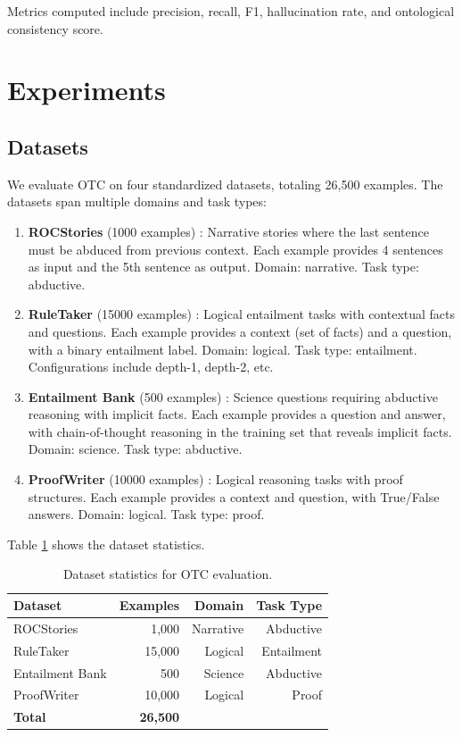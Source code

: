 \documentclass[11pt,letterpaper]{article}
\begin{document}
Metrics computed include precision, recall, F1, hallucination rate, and ontological consistency score.

\section{Experiments}

\subsection{Datasets}

We evaluate OTC on four standardized datasets, totaling 26,500 examples. The datasets span multiple domains and task types:

\begin{enumerate}
    \item \textbf{ROCStories} (1000 examples) \cite{Mostafazadeh2016}: Narrative stories where the last sentence must be abduced from previous context. Each example provides 4 sentences as input and the 5th sentence as output. Domain: narrative. Task type: abductive.
    
    \item \textbf{RuleTaker} (15000 examples) \cite{Clark2020}: Logical entailment tasks with contextual facts and questions. Each example provides a context (set of facts) and a question, with a binary entailment label. Domain: logical. Task type: entailment. Configurations include depth-1, depth-2, etc.
    
    \item \textbf{Entailment Bank} (500 examples) \cite{Dalvi2021}: Science questions requiring abductive reasoning with implicit facts. Each example provides a question and answer, with chain-of-thought reasoning in the training set that reveals implicit facts. Domain: science. Task type: abductive.
    
    \item \textbf{ProofWriter} (10000 examples) \cite{Tafjord2021}: Logical reasoning tasks with proof structures. Each example provides a context and question, with True/False answers. Domain: logical. Task type: proof.
\end{enumerate}

Table \ref{tab:datasets} shows the dataset statistics.

\begin{table}[!htbp]
\centering
\caption{Dataset statistics for OTC evaluation.}
\label{tab:datasets}
\begin{tabular}{lrrr}
\toprule
Dataset & Examples & Domain & Task Type \\
\midrule
ROCStories & 1,000 & Narrative & Abductive \\
RuleTaker & 15,000 & Logical & Entailment \\
Entailment Bank & 500 & Science & Abductive \\
ProofWriter & 10,000 & Logical & Proof \\
\midrule
\textbf{Total} & \textbf{26,500} & & \\
\bottomrule
\end{tabular}
\end{table}
\end{document}
